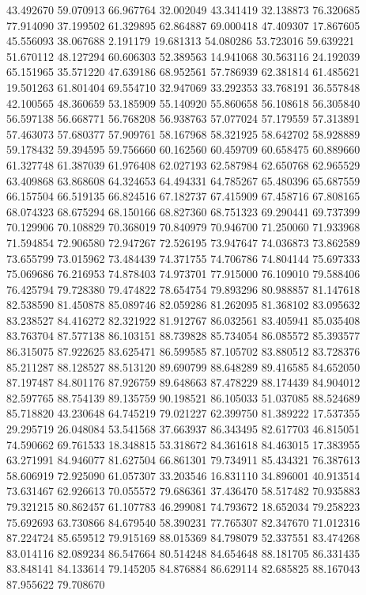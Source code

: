 43.492670
59.070913
66.967764
32.002049
43.341419
32.138873
76.320685
77.914090
37.199502
61.329895
62.864887
69.000418
47.409307
17.867605
45.556093
38.067688
2.191179
19.681313
54.080286
53.723016
59.639221
51.670112
48.127294
60.606303
52.389563
14.941068
30.563116
24.192039
65.151965
35.571220
47.639186
68.952561
57.786939
62.381814
61.485621
19.501263
61.801404
69.554710
32.947069
33.292353
33.768191
36.557848
42.100565
48.360659
53.185909
55.140920
55.860658
56.108618
56.305840
56.597138
56.668771
56.768208
56.938763
57.077024
57.179559
57.313891
57.463073
57.680377
57.909761
58.167968
58.321925
58.642702
58.928889
59.178432
59.394595
59.756660
60.162560
60.459709
60.658475
60.889660
61.327748
61.387039
61.976408
62.027193
62.587984
62.650768
62.965529
63.409868
63.868608
64.324653
64.494331
64.785267
65.480396
65.687559
66.157504
66.519135
66.824516
67.182737
67.415909
67.458716
67.808165
68.074323
68.675294
68.150166
68.827360
68.751323
69.290441
69.737399
70.129906
70.108829
70.368019
70.840979
70.946700
71.250060
71.933968
71.594854
72.906580
72.947267
72.526195
73.947647
74.036873
73.862589
73.655799
73.015962
73.484439
74.371755
74.706786
74.804144
75.697333
75.069686
76.216953
74.878403
74.973701
77.915000
76.109010
79.588406
76.425794
79.728380
79.474822
78.654754
79.893296
80.988857
81.147618
82.538590
81.450878
85.089746
82.059286
81.262095
81.368102
83.095632
83.238527
84.416272
82.321922
81.912767
86.032561
83.405941
85.035408
83.763704
87.577138
86.103151
88.739828
85.734054
86.085572
85.393577
86.315075
87.922625
83.625471
86.599585
87.105702
83.880512
83.728376
85.211287
88.128527
88.513120
89.690799
88.648289
89.416585
84.652050
87.197487
84.801176
87.926759
89.648663
87.478229
88.174439
84.904012
82.597765
88.754139
89.135759
90.198521
86.105033
51.037085
88.524689
85.718820
43.230648
64.745219
79.021227
62.399750
81.389222
17.537355
29.295719
26.048084
53.541568
37.663937
86.343495
82.617703
46.815051
74.590662
69.761533
18.348815
53.318672
84.361618
84.463015
17.383955
63.271991
84.946077
81.627504
66.861301
79.734911
85.434321
76.387613
58.606919
72.925090
61.057307
33.203546
16.831110
34.896001
40.913514
73.631467
62.926613
70.055572
79.686361
37.436470
58.517482
70.935883
79.321215
80.862457
61.107783
46.299081
74.793672
18.652034
79.258223
75.692693
63.730866
84.679540
58.390231
77.765307
82.347670
71.012316
87.224724
85.659512
79.915169
88.015369
84.798079
52.337551
83.474268
83.014116
82.089234
86.547664
80.514248
84.654648
88.181705
86.331435
83.848141
84.133614
79.145205
84.876884
86.629114
82.685825
88.167043
87.955622
79.708670

